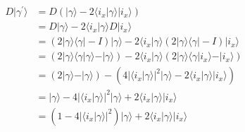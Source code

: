 \begin{equation}
	\begin{split}
		D\vert \gamma^{\prime} \rangle &= D\left(\vert \gamma \rangle - 2\langle i_{x} \vert \gamma \rangle \vert i_{x} \rangle\right)\\
		&= D\vert \gamma \rangle - 2\langle i_{x} \vert \gamma \rangle D\vert i_{x} \rangle\\
		&= \left(2\vert \gamma \rangle\langle \gamma \vert - I\right)\vert \gamma \rangle - 2\langle i_{x} \vert \gamma \rangle \left(2\vert \gamma \rangle\langle \gamma \vert - I\right) \vert i_{x} \rangle\\
		&= \left(2\vert \gamma \rangle\langle \gamma \vert \gamma \rangle - \vert \gamma \rangle\right)- 2\langle i_{x} \vert \gamma \rangle \left(2\vert \gamma \rangle\langle \gamma \vert i_{x} \rangle - \vert i_{x} \rangle\right)\\
		&= \left(2\vert \gamma \rangle - \vert \gamma \rangle\right) - \left( 4 \left\vert \langle i_{x} \vert \gamma \rangle\right\vert^{2}\vert \gamma \rangle - 2\langle i_{x} \vert \gamma \rangle \vert i_{x} \rangle\right)\\
		&= \vert \gamma \rangle - 4\left\vert \langle i_{x} \vert \gamma \rangle\right\vert^{2}\vert \gamma \rangle + 2\langle i_{x} \vert \gamma \rangle \vert i_{x} \rangle\\
		&= \left(1 - 4\left\vert \langle i_{x} \vert \gamma \rangle\right\vert^{2} \right) \vert \gamma \rangle + 2\langle i_{x} \vert \gamma \rangle \vert i_{x} \rangle\\
	\end{split}
\end{equation}

